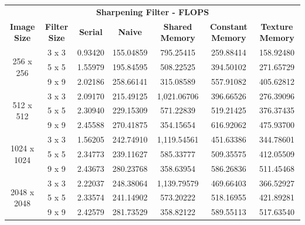 \documentclass[10pt]{article}
\begin{document}
\begin{table}[H]
\small
\begin{tabular}{ccccccc}
\multicolumn{7}{c}{\textbf{Sharpening Filter - FLOPS}}                                                                                                               \\
\textbf{Image Size}          & \textbf{Filter Size} & \textbf{Serial} & \textbf{Naive} & \textbf{Shared Memory} & \textbf{Constant Memory} & \textbf{Texture Memory} \\ \hline
\multirow{3}{*}{256 x 256}   & 3 x 3                & 0.93420         & 155.04859      & 795.25415              & 259.88414                & 158.92480               \\
                             & 5 x 5                & 1.55979         & 195.84595      & 508.22525              & 394.50102                & 271.65729               \\
                             & 9 x 9                & 2.02186         & 258.66141      & 315.08589              & 557.91082                & 405.62812               \\ \hline
\multirow{3}{*}{512 x 512}   & 3 x 3                & 2.09170         & 215.49125      & 1,021.06706            & 396.66526                & 276.39096               \\
                             & 5 x 5                & 2.30940         & 229.15309      & 571.22839              & 519.21425                & 376.37435               \\
                             & 9 x 9                & 2.45588         & 270.41875      & 354.15654              & 616.92062                & 475.93700               \\ \hline
\multirow{3}{*}{1024 x 1024} & 3 x 3                & 1.56205         & 242.74910      & 1,119.54561            & 451.63386                & 344.78601               \\
                             & 5 x 5                & 2.34773         & 239.11627      & 585.33777              & 509.35575                & 412.05509               \\
                             & 9 x 9                & 2.43673         & 280.23768      & 358.63954              & 586.26836                & 511.45468               \\ \hline
\multirow{3}{*}{2048 x 2048} & 3 x 3                & 2.22037         & 248.38064      & 1,139.79579            & 469.66403                & 366.52927               \\
                             & 5 x 5                & 2.33574         & 241.14902      & 573.20222              & 518.16955                & 421.89281               \\
                             & 9 x 9                & 2.42579         & 281.73529      & 358.82122              & 589.55113                & 517.63540              
\end{tabular}
\end{table}
\end{document}
